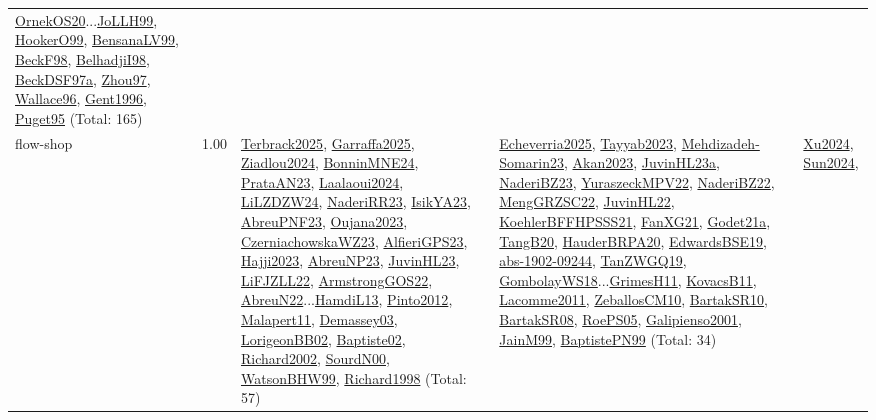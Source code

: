 {\begin{longtable}{p{3cm}r>{\raggedright\arraybackslash}p{6cm}>{\raggedright\arraybackslash}p{6cm}>{\raggedright\arraybackslash}p{8cm}}
\hyperref[detail:OrnekOS20]{OrnekOS20}...\hyperref[detail:JoLLH99]{JoLLH99}, \hyperref[detail:HookerO99]{HookerO99}, \hyperref[detail:BensanaLV99]{BensanaLV99}, \hyperref[detail:BeckF98]{BeckF98}, \hyperref[detail:BelhadjiI98]{BelhadjiI98}, \hyperref[detail:BeckDSF97a]{BeckDSF97a}, \hyperref[detail:Zhou97]{Zhou97}, \hyperref[detail:Wallace96]{Wallace96}, \hyperref[detail:Gent1996]{Gent1996}, \hyperref[detail:Puget95]{Puget95} (Total: 165)\\
\index{flow-shop}\index{Concepts!flow-shop}flow-shop &  1.00 & \hyperref[detail:Terbrack2025]{Terbrack2025}, \hyperref[detail:Garraffa2025]{Garraffa2025}, \hyperref[detail:Ziadlou2024]{Ziadlou2024}, \hyperref[detail:BonninMNE24]{BonninMNE24}, \hyperref[detail:PrataAN23]{PrataAN23}, \hyperref[detail:Laalaoui2024]{Laalaoui2024}, \hyperref[detail:LiLZDZW24]{LiLZDZW24}, \hyperref[detail:NaderiRR23]{NaderiRR23}, \hyperref[detail:IsikYA23]{IsikYA23}, \hyperref[detail:AbreuPNF23]{AbreuPNF23}, \hyperref[detail:Oujana2023]{Oujana2023}, \hyperref[detail:CzerniachowskaWZ23]{CzerniachowskaWZ23}, \hyperref[detail:AlfieriGPS23]{AlfieriGPS23}, \hyperref[detail:Hajji2023]{Hajji2023}, \hyperref[detail:AbreuNP23]{AbreuNP23}, \hyperref[detail:JuvinHL23]{JuvinHL23}, \hyperref[detail:LiFJZLL22]{LiFJZLL22}, \hyperref[detail:ArmstrongGOS22]{ArmstrongGOS22}, \hyperref[detail:AbreuN22]{AbreuN22}...\hyperref[detail:HamdiL13]{HamdiL13}, \hyperref[detail:Pinto2012]{Pinto2012}, \hyperref[detail:Malapert11]{Malapert11}, \hyperref[detail:Demassey03]{Demassey03}, \hyperref[detail:LorigeonBB02]{LorigeonBB02}, \hyperref[detail:Baptiste02]{Baptiste02}, \hyperref[detail:Richard2002]{Richard2002}, \hyperref[detail:SourdN00]{SourdN00}, \hyperref[detail:WatsonBHW99]{WatsonBHW99}, \hyperref[detail:Richard1998]{Richard1998} (Total: 57) & \hyperref[detail:Echeverria2025]{Echeverria2025}, \hyperref[detail:Tayyab2023]{Tayyab2023}, \hyperref[detail:Mehdizadeh-Somarin23]{Mehdizadeh-Somarin23}, \hyperref[detail:Akan2023]{Akan2023}, \hyperref[detail:JuvinHL23a]{JuvinHL23a}, \hyperref[detail:NaderiBZ23]{NaderiBZ23}, \hyperref[detail:YuraszeckMPV22]{YuraszeckMPV22}, \hyperref[detail:NaderiBZ22]{NaderiBZ22}, \hyperref[detail:MengGRZSC22]{MengGRZSC22}, \hyperref[detail:JuvinHL22]{JuvinHL22}, \hyperref[detail:KoehlerBFFHPSSS21]{KoehlerBFFHPSSS21}, \hyperref[detail:FanXG21]{FanXG21}, \hyperref[detail:Godet21a]{Godet21a}, \hyperref[detail:TangB20]{TangB20}, \hyperref[detail:HauderBRPA20]{HauderBRPA20}, \hyperref[detail:EdwardsBSE19]{EdwardsBSE19}, \hyperref[detail:abs-1902-09244]{abs-1902-09244}, \hyperref[detail:TanZWGQ19]{TanZWGQ19}, \hyperref[detail:GombolayWS18]{GombolayWS18}...\hyperref[detail:GrimesH11]{GrimesH11}, \hyperref[detail:KovacsB11]{KovacsB11}, \hyperref[detail:Lacomme2011]{Lacomme2011}, \hyperref[detail:ZeballosCM10]{ZeballosCM10}, \hyperref[detail:BartakSR10]{BartakSR10}, \hyperref[detail:BartakSR08]{BartakSR08}, \hyperref[detail:RoePS05]{RoePS05}, \hyperref[detail:Galipienso2001]{Galipienso2001}, \hyperref[detail:JainM99]{JainM99}, \hyperref[detail:BaptistePN99]{BaptistePN99} (Total: 34) & \hyperref[detail:Xu2024]{Xu2024}, \hyperref[detail:Sun2024]{Sun2024}, 
\end{longtable}}
